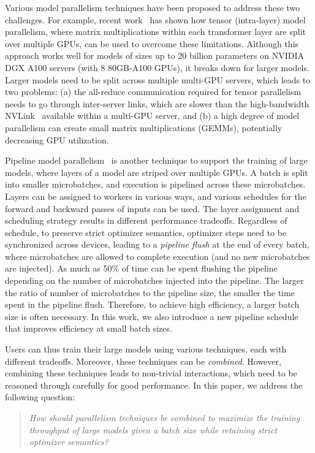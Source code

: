 Various model parallelism techniques have been proposed to address these two challenges. For example, recent work~\cite{mesh_tf,shoeybi2019megatron} has shown how tensor (intra-layer) model parallelism, where matrix multiplications within each transformer layer are split over multiple GPUs, can be used to overcome these limitations. Although this approach works well for models of sizes up to 20 billion parameters on NVIDIA DGX A100 servers (with 8 80GB-A100 GPUs), it breaks down for larger models. Larger models need to be split across multiple multi-GPU servers, which leads to two problems: (a) the all-reduce communication required for tensor parallelism needs to go through inter-server links, which are slower than the high-bandwidth NVLink~\cite{nvlink} available within a multi-GPU server, and (b) a high degree of model parallelism can create small matrix multiplications (GEMMs), potentially decreasing GPU utilization.

Pipeline model parallelism~\cite{narayanan2019pipedream, huang2019gpipe,narayanan2021memory, yang2021pipemare, pb2021kosson, fan2021dapple} is another technique to support the training of large models, where layers of a model are striped over multiple GPUs. A batch is split into smaller microbatches, and execution is pipelined across these microbatches. Layers can be assigned to workers in various ways, and various schedules for the forward and backward passes of inputs can be used. The layer assignment and scheduling strategy results in different performance tradeoffs. Regardless of schedule, to preserve strict optimizer semantics, optimizer steps need to be synchronized across devices, leading to a \emph{pipeline flush} at the end of every batch, where microbatches are allowed to complete execution (and no new microbatches are injected). As much as 50\% of time can be spent flushing the pipeline depending on the number of microbatches injected into the pipeline. The larger the ratio of number of microbatches to the pipeline size, the smaller the time spent in the pipeline flush. Therefore, to achieve high efficiency, a larger batch size is often necessary. In this work, we also introduce a new pipeline schedule that improves efficiency at small batch sizes.

Users can thus train their large models using various techniques, each with different tradeoffs. Moreover, these techniques can be \emph{combined}. However, combining these techniques leads to non-trivial interactions, which need to be reasoned through carefully for good performance. In this paper, we address the following question:
\begin{quote}
    \emph{How should parallelism techniques be combined to maximize the training throughput of large models given a batch size while retaining strict optimizer semantics?}
\end{quote}

